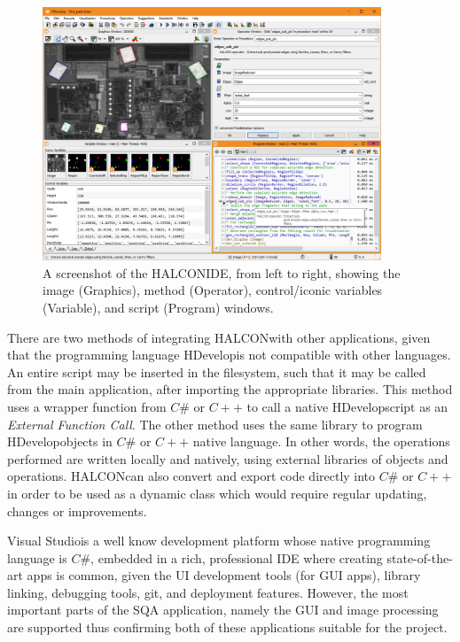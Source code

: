 \documentclass[fleqn,twoside,12pt]{report}
\begin{document}
\begin{figure}[h]
	\centering
	\includegraphics[width=0.9\textwidth]{halcon_ide.png}
	\caption{A screenshot of the HALCON\texttrademark IDE, from left to right, showing the image (Graphics), method (Operator), control/iconic variables (Variable), and script (Program) windows.}
	\label{fig:halcon_ide}
\end{figure} 


There are two methods of integrating HALCON\texttrademark with other applications, given that the programming language HDevelop\texttrademark is not compatible with other languages. An entire script may be inserted in the filesystem, such that it may be called from the main application, after importing the appropriate libraries. This method uses a wrapper function from $C\#$ or $C++$ to call a native HDevelop\texttrademark script as an \textit{External Function Call}. The other method uses the same library to program HDevelop\texttrademark objects in $C\#$ or $C++$ native language. In other words, the operations performed are written locally and natively, using external libraries of objects and operations. HALCON\texttrademark can also convert and export code directly into $C\#$ or $C++$ in order to be used as a dynamic class which would require regular updating, changes or improvements.

Visual Studio\textregistered is a well know development platform whose native programming language is $C\#$, embedded in a rich, professional IDE where creating state-of-the-art apps is common, given the UI development tools (for GUI apps), library linking, debugging tools, git, and deployment features. However, the most important parts of the SQA application, namely the GUI and image processing are supported thus confirming both of these applications suitable for the project.
\end{document}
